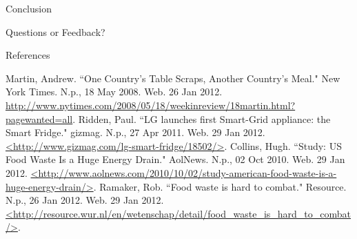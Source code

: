 \documentclass[t]{beamer}
\begin{document}
\begin{frame}{Conclusion}
\LARGE
\begin{center}
Questions or Feedback?
\end{center}
\end{frame}

\begin{frame}{References}
\footnotesize
\begin{thebibliography}{9}
Martin, Andrew. ``One Country's Table Scraps, Another Country's Meal." New York Times. N.p., 18 May 2008. Web. 26 Jan 2012. 
\url{http://www.nytimes.com/2008/05/18/weekinreview/18martin.html?pagewanted=all}.
Ridden, Paul. ``LG launches first Smart-Grid appliance: the Smart Fridge." gizmag. N.p., 27 Apr 2011. Web. 29 Jan 2012. \url{<http://www.gizmag.com/lg-smart-fridge/18502/>}.
Collins, Hugh. ``Study: US Food Waste Is a Huge Energy Drain." AolNews. N.p., 02 Oct 2010. Web. 29 Jan 2012. \url{<http://www.aolnews.com/2010/10/02/study-american-food-waste-is-a-huge-energy-drain/>}.
Ramaker, Rob. ``Food waste is hard to combat." Resource. N.p., 26 Jan 2012. Web. 29 Jan 2012. \url{<http://resource.wur.nl/en/wetenschap/detail/food_waste_is_hard_to_combat/>}.
 \end{thebibliography}
\end{frame}
\end{document}
